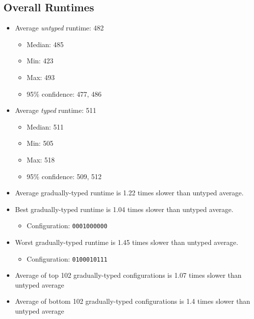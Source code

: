 \documentclass{article}
\newcommand{\mono}[1]{\texttt{#1}}
\begin{document}
\subsection{Overall Runtimes}
\begin{itemize}
\item Average \emph{untyped} runtime: 482
  \begin{itemize}
  \item Median: 485
  \item Min: 423
  \item Max: 493
  \item 95\% confidence: 477, 486
  \end{itemize}
\item Average \emph{typed} runtime: 511
  \begin{itemize}
  \item Median: 511
  \item Min: 505
  \item Max: 518
  \item 95\% confidence: 509, 512
  \end{itemize}
\item Average gradually-typed runtime is 1.22 times slower than untyped average.
\item Best gradually-typed runtime is 1.04 times slower than untyped average.
\begin{itemize}\item Configuration: \mono{0001000000}\end{itemize}
\item Worst gradually-typed runtime is 1.45 times slower than untyped average.
\begin{itemize}\item Configuration: \mono{0100010111}\end{itemize}
\item Average of top 102 gradually-typed configurations is 1.07 times slower than untyped average
\item Average of bottom 102 gradually-typed configurations is 1.4 times slower than untyped average
\end{itemize}
\end{document}
